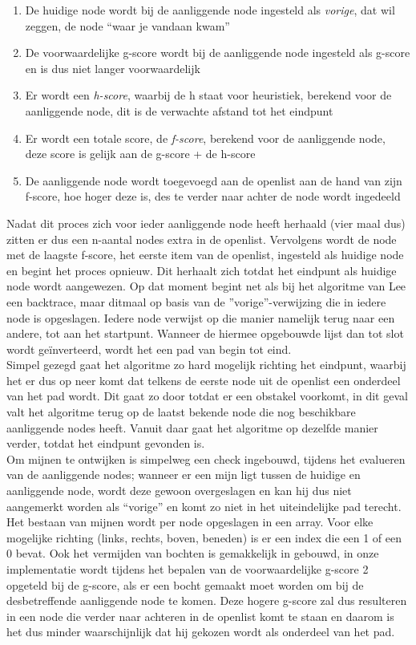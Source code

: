 \documentclass{report}
\begin{document}
\begin{enumerate}
	\item De huidige node wordt bij de aanliggende node ingesteld als \textit{vorige}, dat wil zeggen, de node ``waar je vandaan kwam''
	\item De voorwaardelijke g-score wordt bij de aanliggende node ingesteld als g-score en is dus niet langer voorwaardelijk
	\item Er wordt een \textit{h-score}, waarbij de h staat voor heuristiek, berekend voor de aanliggende node, dit is de verwachte afstand tot het eindpunt
	\item Er wordt een totale score, de \textit{f-score}, berekend voor de aanliggende node, deze score is gelijk aan de g-score + de h-score
	\item De aanliggende node wordt toegevoegd aan de openlist aan de hand van zijn f-score, hoe hoger deze is, des te verder naar achter de node wordt ingedeeld
\end{enumerate}

Nadat dit proces zich voor ieder aanliggende node heeft herhaald (vier maal dus) zitten er dus een n-aantal nodes extra in de openlist.
Vervolgens wordt de node met de laagste f-score, het eerste item van de openlist, ingesteld als huidige node en begint het proces opnieuw.
Dit herhaalt zich totdat het eindpunt als huidige node wordt aangewezen.
Op dat moment begint net als bij het algoritme van Lee een backtrace, maar ditmaal op basis van de ''vorige''-verwijzing die in iedere node is opgeslagen.
Iedere node verwijst op die manier namelijk terug naar een andere, tot aan het startpunt.
Wanneer de hiermee opgebouwde lijst dan tot slot wordt geïnverteerd, wordt het een pad van begin tot eind.
\\

Simpel gezegd gaat het algoritme zo hard mogelijk richting het eindpunt, waarbij het er dus op neer komt dat telkens de eerste node uit de openlist een onderdeel van het pad wordt.
Dit gaat zo door totdat er een obstakel voorkomt, in dit geval valt het algoritme terug op de laatst bekende node die nog beschikbare aanliggende nodes heeft.
Vanuit daar gaat het algoritme op dezelfde manier verder, totdat het eindpunt gevonden is.
\\

Om mijnen te ontwijken is simpelweg een check ingebouwd, tijdens het evalueren van de aanliggende nodes; wanneer er een mijn ligt tussen de huidige en aanliggende node, wordt deze gewoon overgeslagen en kan hij dus niet aangemerkt worden als ``vorige'' en komt zo niet in het uiteindelijke pad terecht.
Het bestaan van mijnen wordt per node opgeslagen in een array.
Voor elke mogelijke richting (links, rechts, boven, beneden) is er een index die een 1 of een 0 bevat.
Ook het vermijden van bochten is gemakkelijk in gebouwd, in onze implementatie wordt tijdens het bepalen van de voorwaardelijke g-score 2 opgeteld bij de g-score, als er een bocht gemaakt moet worden om bij de desbetreffende aanliggende node te komen.
Deze hogere g-score zal dus resulteren in een node die verder naar achteren in de openlist komt te staan en daarom is het dus minder waarschijnlijk dat hij gekozen wordt als onderdeel van het pad.
\\
\end{document}
